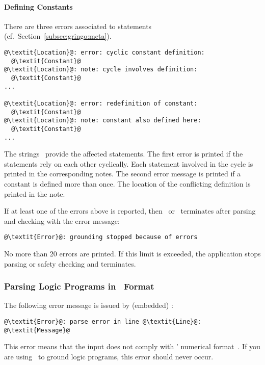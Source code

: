 \paragraph{Defining Constants}
There are three errors associated to  statements (cf.~Section~\ref{subsec:gringo:meta}).
\begin{lstlisting}[numbers=none,escapechar=@]
@\textit{Location}@: error: cyclic constant definition:
  @\textit{Constant}@
@\textit{Location}@: note: cycle involves definition:
  @\textit{Constant}@
...

@\textit{Location}@: error: redefinition of constant:
  @\textit{Constant}@
@\textit{Location}@: note: constant also defined here:
  @\textit{Constant}@
...

\end{lstlisting}
The strings~ provide the affected  statements.
The first error is printed if the statements rely on each other cyclically.
Each statement involved in the cycle is printed in the corresponding notes.
The second error message is printed if a constant is defined more than once.
The location of the conflicting definition is printed in the note.

If at least one of the errors above is reported,
then \gringo\ or \clingo\ terminates after parsing and checking with the error message:
\begin{lstlisting}[numbers=none,escapechar=@]
@\textit{Error}@: grounding stopped because of errors
\end{lstlisting}

\begin{note}
No more than 20 errors are printed.
If this limit is exceeded, the application stops parsing or safety checking and terminates.
\end{note}

\subsubsection{Parsing Logic Programs in \smodels\ Format}\label{subsec:error:lparse}
The following error message is issued by (embedded) \clasp:
%
\begin{lstlisting}[numbers=none,escapechar=@]
@\textit{Error}@: parse error in line @\textit{Line}@: @\textit{Message}@
\end{lstlisting}
%
This error means that the input does not comply with \smodels' numerical format~\cite{lparseManual}.
If you are using \gringo\ to ground logic programs,
this error should never occur.

